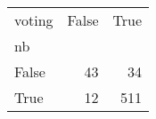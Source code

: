 \begin{tabular}{lrr}
\toprule
voting &  False &  True  \\
nb    &        &        \\
\midrule
False &     43 &     34 \\
True  &     12 &    511 \\
\bottomrule
\end{tabular}
